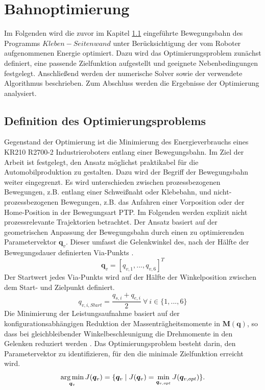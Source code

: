 \chapter{Bahnoptimierung}
Im Folgenden wird die zuvor im Kapitel \ref{} eingeführte Bewegungsbahn des Programms $Kleben-Seitenwand$ unter Berücksichtigung der vom Roboter aufgenommenen Energie optimiert. Dazu wird das Optimierungsproblem zunächst definiert, eine passende Zielfunktion aufgestellt und geeignete Nebenbedingungen festgelegt. Anschließend werden der numerische Solver sowie der verwendete Algorithmus beschrieben. Zum Abschluss werden die Ergebnisse der  Optimierung analysiert. 
%
\section{Definition des Optimierungsproblems}
Gegenstand der Optimierung ist die Minimierung des Energieverbrauchs eines KR210 R2700-2 Industrieroboters entlang einer Bewegungsbahn. Im Ziel der Arbeit ist festgelegt, den Ansatz möglichst praktikabel für die Automobilproduktion zu gestalten. Dazu wird der Begriff der Bewegungsbahn weiter eingegrenzt. Es wird unterschieden zwischen prozessbezogenen Bewegungen, z.B. entlang einer Schweißnaht oder Klebebahn, und nicht-prozessbezogenen Bewegungen, z.B. das Anfahren einer Vorposition oder der Home-Position in der Bewegungsart PTP. Im Folgenden werden explizit nicht prozessrelevante Trajektorien betrachtet. Der Ansatz basiert auf der geometrischen Anpassung  der Bewegungsbahn durch einen zu optimierenden Parametervektor $\bm{q}_{v}$. Dieser umfasst die Gelenkwinkel des, nach der Hälfte der Bewegungsdauer definierten Via-Punkts \cite[S~532~ f.]{Ziaukas.2017}.
%
\begin{equation}
	\label{eqn:parametervektor}
	\bm{q}_{v} = [q_{v,1},...,q_{v,6}]^T 
\end{equation}
%
Der Startwert jedes Via-Punkts wird auf der Hälfte der Winkelposition zwischen dem Start- und Zielpunkt definiert.
\begin{equation}
	\label{eqn:parametervektor-startkonfiguration}
	q_{v,i,Start} = \dfrac{q_{s,i}+q_{e,i}}{2} ~\forall~ i \in \{1,...,6\}
\end{equation}
Die Minimierung der Leistungsaufnahme basiert auf der konfigurationsabhängigen Reduktion der Massenträgheitsmomente in $\bm{M}(\bm{q})$, so dass bei gleichbleibender Winkelbeschleunigung die Drehmomente in den Gelenken reduziert werden \cite[S.~531]{Ziaukas.2017}. Das Optimierungsproblem besteht darin, den Parametervektor zu identifizieren, für den die minimale Zielfunktion erreicht wird.
%
\begin{equation}
	\operatorname*{arg\,min}_{\bm{q}_{v}} J(\bm{q}_{v}) = \{\bm{q}_{v} \mid J(\bm{q}_{v}) = \min_{\bm{q}_{v,opt}} J(\bm{q}_{v,opt})\}.
\end{equation}
%
